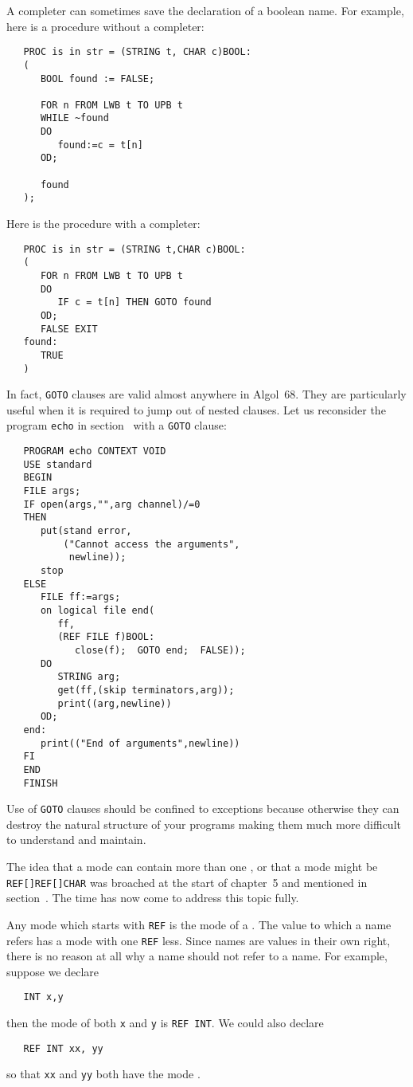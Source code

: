 A completer can sometimes save the declaration of a boolean name. For
example, here is a procedure without a completer:
\begin{verbatim}
   PROC is in str = (STRING t, CHAR c)BOOL:
   (
      BOOL found := FALSE;
   
      FOR n FROM LWB t TO UPB t
      WHILE ~found
      DO
         found:=c = t[n]
      OD;
   
      found
   );
\end{verbatim}
\noindent
Here is the procedure with a completer:
\begin{verbatim}
   PROC is in str = (STRING t,CHAR c)BOOL:
   (
      FOR n FROM LWB t TO UPB t
      DO
         IF c = t[n] THEN GOTO found
      OD;
      FALSE EXIT
   found:
      TRUE
   )
\end{verbatim}

In fact, \verb|GOTO| clauses are valid almost anywhere in Algol~68.
They are particularly useful when it is required to jump out of nested
clauses. Let us reconsider the program \verb|echo| in
section~ with a \verb|GOTO| clause:
\begin{verbatim}
   PROGRAM echo CONTEXT VOID
   USE standard
   BEGIN
   FILE args;
   IF open(args,"",arg channel)/=0
   THEN
      put(stand error,
          ("Cannot access the arguments",
           newline));
      stop
   ELSE
      FILE ff:=args;
      on logical file end(
         ff,
         (REF FILE f)BOOL:
            close(f);  GOTO end;  FALSE));
      DO
         STRING arg;
         get(ff,(skip terminators,arg));
         print((arg,newline))
      OD;
   end:
      print(("End of arguments",newline))
   FI
   END
   FINISH
\end{verbatim}
\noindent
Use of \verb|GOTO| clauses should be confined to exceptions because
otherwise they can destroy the natural structure of your programs
making them much more difficult to understand and maintain.

The idea that a mode can contain more than one , or that a
mode might be \verb|REF[]REF[]CHAR| was broached at the start of
chapter~5 and mentioned in section~. The time has now
come to address this topic fully.

Any mode which starts with \verb|REF| is the mode of a
. The value to which a name refers has a mode with one
\verb|REF| less.  Since names are values in their own right, there is
no reason at all why a name should not refer to a name.  For example,
suppose we declare
\begin{verbatim}
   INT x,y
\end{verbatim}
\noindent
then the mode of both \verb|x| and \verb|y| is \verb|REF INT|. We
could also declare
\begin{verbatim}
   REF INT xx, yy
\end{verbatim}
\noindent
so that \verb|xx| and \verb|yy| both have the mode
.

